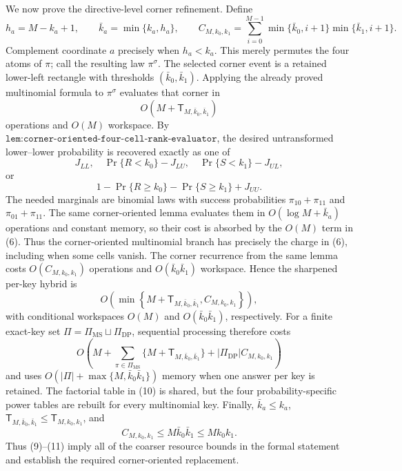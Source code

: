 We now prove the directive-level corner refinement. Define
\[
h_a=M-k_a+1,\qquad \bar k_a=\min\{k_a,h_a\},\qquad
C_{M,k_0,k_1}=\sum_{i=0}^{M-1}\min\{\bar k_0,i+1\}\min\{\bar k_1,i+1\}.
\tag{5}
\]
Complement coordinate \(a\) precisely when \(h_a<k_a\). This merely permutes the four atoms of \(\pi\); call the resulting law \(\pi^\sigma\). The selected corner event is a retained lower-left rectangle with thresholds \((\bar k_0,\bar k_1)\). Applying the already proved multinomial formula to \(\pi^\sigma\) evaluates that corner in
\[
O\!\left(M+\mathsf T_{M,\bar k_0,\bar k_1}\right)
\tag{6}
\]
operations and \(O(M)\) workspace. By \(\texttt{lem:corner-oriented-four-cell-rank-evaluator}\), the desired untransformed lower--lower probability is recovered exactly as one of
\[
J_{LL},\quad \Pr\{R<k_0\}-J_{LU},\quad \Pr\{S<k_1\}-J_{UL},
\tag{7}
\]
or
\[
1-\Pr\{R\ge k_0\}-\Pr\{S\ge k_1\}+J_{UU}.
\tag{8}
\]
The needed marginals are binomial laws with success probabilities \(\pi_{10}+\pi_{11}\) and \(\pi_{01}+\pi_{11}\). The same corner-oriented lemma evaluates them in \(O(\log M+\bar k_a)\) operations and constant memory, so their cost is absorbed by the \(O(M)\) term in (6). Thus the corner-oriented multinomial branch has precisely the charge in (6), including when some cells vanish. The corner recurrence from the same lemma costs \(O(C_{M,k_0,k_1})\) operations and \(O(\bar k_0\bar k_1)\) workspace. Hence the sharpened per-key hybrid is
\[
O\!\left(\min\left\{M+\mathsf T_{M,\bar k_0,\bar k_1},C_{M,k_0,k_1}\right\}\right),
\tag{9}
\]
with conditional workspaces \(O(M)\) and \(O(\bar k_0\bar k_1)\), respectively. For a finite exact-key set \(\Pi=\Pi_{\mathrm{MS}}\sqcup\Pi_{\mathrm{DP}}\), sequential processing therefore costs
\[
O\!\left(M+\sum_{\pi\in\Pi_{\mathrm{MS}}}\{M+\mathsf T_{M,\bar k_0,\bar k_1}\}+|\Pi_{\mathrm{DP}}|C_{M,k_0,k_1}\right)
\tag{10}
\]
and uses \(O(|\Pi|+\max\{M,\bar k_0\bar k_1\})\) memory when one answer per key is retained. The factorial table in (10) is shared, but the four probability-specific power tables are rebuilt for every multinomial key. Finally, \(\bar k_a\le k_a\), \(\mathsf T_{M,\bar k_0,\bar k_1}\le\mathsf T_{M,k_0,k_1}\), and
\[
C_{M,k_0,k_1}\le M\bar k_0\bar k_1\le Mk_0k_1.
\tag{11}
\]
Thus (9)--(11) imply all of the coarser resource bounds in the formal statement and establish the required corner-oriented replacement.